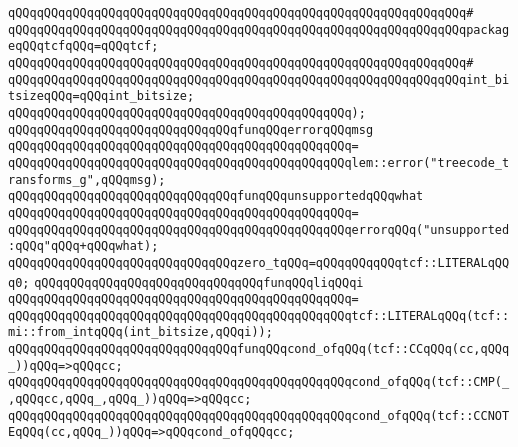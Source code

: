 \verb|qQQqqQQqqQQqqQQqqQQqqQQqqQQqqQQqqQQqqQQqqQQqqQQqqQQqqQQqqQQqqQQq#|\newline
\verb|qQQqqQQqqQQqqQQqqQQqqQQqqQQqqQQqqQQqqQQqqQQqqQQqqQQqqQQqqQQqqQQqpackageqQQqtcfqQQq=qQQqtcf;|\newline
\verb|qQQqqQQqqQQqqQQqqQQqqQQqqQQqqQQqqQQqqQQqqQQqqQQqqQQqqQQqqQQqqQQq#|\newline
\verb|qQQqqQQqqQQqqQQqqQQqqQQqqQQqqQQqqQQqqQQqqQQqqQQqqQQqqQQqqQQqqQQqint_bitsizeqQQq=qQQqint_bitsize;|\newline
\verb|qQQqqQQqqQQqqQQqqQQqqQQqqQQqqQQqqQQqqQQqqQQqqQQq);|\newline
\newline
\newline
\verb|qQQqqQQqqQQqqQQqqQQqqQQqqQQqqQQqfunqQQqerrorqQQqmsg|\newline
\verb|qQQqqQQqqQQqqQQqqQQqqQQqqQQqqQQqqQQqqQQqqQQqqQQq=|\newline
\verb|qQQqqQQqqQQqqQQqqQQqqQQqqQQqqQQqqQQqqQQqqQQqqQQqlem::error("treecode_transforms_g",qQQqmsg);|\newline
\newline
\verb|qQQqqQQqqQQqqQQqqQQqqQQqqQQqqQQqfunqQQqunsupportedqQQqwhat|\newline
\verb|qQQqqQQqqQQqqQQqqQQqqQQqqQQqqQQqqQQqqQQqqQQqqQQq=|\newline
\verb|qQQqqQQqqQQqqQQqqQQqqQQqqQQqqQQqqQQqqQQqqQQqqQQqerrorqQQq("unsupported:qQQq"qQQq+qQQqwhat);|\newline
\newline
\verb|qQQqqQQqqQQqqQQqqQQqqQQqqQQqqQQqzero_tqQQq=qQQqqQQqqQQqtcf::LITERALqQQq0;|\newline
\newline
\verb|qQQqqQQqqQQqqQQqqQQqqQQqqQQqqQQqfunqQQqliqQQqi|\newline
\verb|qQQqqQQqqQQqqQQqqQQqqQQqqQQqqQQqqQQqqQQqqQQqqQQq=|\newline
\verb|qQQqqQQqqQQqqQQqqQQqqQQqqQQqqQQqqQQqqQQqqQQqqQQqtcf::LITERALqQQq(tcf::mi::from_intqQQq(int_bitsize,qQQqi));|\newline
\newline
\verb|qQQqqQQqqQQqqQQqqQQqqQQqqQQqqQQqfunqQQqcond_ofqQQq(tcf::CCqQQq(cc,qQQq_))qQQq=>qQQqcc;|\newline
\verb|qQQqqQQqqQQqqQQqqQQqqQQqqQQqqQQqqQQqqQQqqQQqqQQqcond_ofqQQq(tcf::CMP(_,qQQqcc,qQQq_,qQQq_))qQQq=>qQQqcc;|\newline
\verb|qQQqqQQqqQQqqQQqqQQqqQQqqQQqqQQqqQQqqQQqqQQqqQQqcond_ofqQQq(tcf::CCNOTEqQQq(cc,qQQq_))qQQq=>qQQqcond_ofqQQqcc;|\newline
